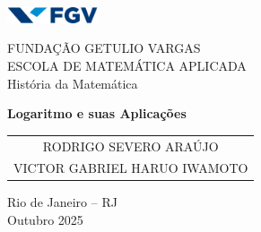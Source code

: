 \begin{titlepage}
    \centering 


    \includegraphics[width=0.2\textwidth]{img/fgv.png} 
    
    \vspace{0.3cm} 

    {\Large FUNDAÇÃO GETULIO VARGAS \\}
    {\normalsize ESCOLA DE MATEMÁTICA APLICADA \\}
    {\normalsize História da Matemática}

    \vfill 

    {\bfseries\Large Logaritmo e suas Aplicações }

    \vfill 

    \begin{tabular}{c}
        RODRIGO SEVERO ARAÚJO\\
        VICTOR GABRIEL HARUO IWAMOTO \\
    \end{tabular}

    \vspace{2.cm} 

    {Rio de Janeiro -- RJ \\} 
    {Outubro 2025}

\end{titlepage}